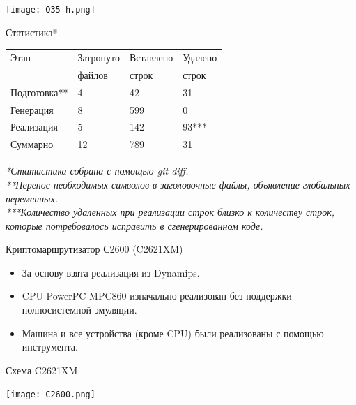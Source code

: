 \documentclass[unicode,hyperref={unicode=true}]{beamer}
\theoremstyle{definition}
\theoremstyle{plain}
\begin{document}
\begin{frame}{}
\begin{center}
\texttt{[image: Q35-h.png]}
\end{center}
\end{frame}



\begin{frame}{Статистика*}
\begin{center}
\begin{tabular}{l|lll}
Этап         & Затронуто & Вставлено & Удалено \\
             & файлов    & строк     & строк   \\
\hline
Подготовка** & 4         & 42        & 31      \\
Генерация    & 8         & 599       & 0       \\
Реализация   & 5         & 142       & 93***   \\
Суммарно     & 12        & 789       & 31      \\
\end{tabular}
\end{center}
\vfill
\it{*Статистика собрана с помощью git diff.}\\
\it{**Перенос необходимых символов в заголовочные файлы,
объявление глобальных переменных.}\\
\it{***Количество удаленных при реализации строк близко к количеству строк,
которые потребовалось исправить в сгенерированном коде.}
\end{frame}



\begin{frame}{Криптомаршрутизатор С2600 (C2621XM)}
\begin{itemize}
\item За основу взята реализация из Dynamips.
\item CPU PowerPC MPC860 изначально реализован без поддержки полносистемной
эмуляции.
\item Машина и все устройства (кроме CPU) были реализованы с помощью
инструмента.
\end{itemize}
\end{frame}



\begin{frame}{Схема C2621XM}
\begin{center}
\texttt{[image: C2600.png]}
\end{center}
\end{frame}
\end{document}
